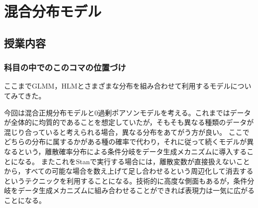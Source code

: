 \section{混合分布モデル}
\label{lesson2_28}
\subsection{授業内容}
\subsubsection{科目の中でのこのコマの位置づけ}
ここまでGLMM，HLMとさまざまな分布を組み合わせて利用するモデルについてみてきた。

今回は混合正規分布モデルと0過剰ポアソンモデルを考える。これまではデータが全体的に均質的であることを想定していたが，そもそも異なる種類のデータが混じり合っていると考えられる場合，異なる分布をあてがう方が良い。
ここでどちらの分布に属するかがある種の確率で代わり，それに従って続くモデルが異なるという，離散確率分布による条件分岐をデータ生成メカニズムに導入することになる。
またこれをStanで実行する場合には，離散変数が直接扱えないことから，すべての可能な場合を数え上げて足し合わせるという周辺化して消去するというテクニックを利用することになる。技術的に高度な側面もあるが，条件分岐をデータ生成メカニズムに組み合わせることができれば表現力は一気に広がることになる。
